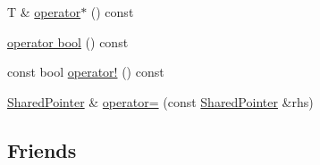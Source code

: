 \begin{DoxyCompactItemize}
\item 
T \& \hyperlink{classprism_1_1memory_1_1_shared_pointer_adf943a2f6f6a11cc995297a10214c6c1}{operator$\ast$} () const 
\item 
\hyperlink{classprism_1_1memory_1_1_shared_pointer_a212f5f8d8a4580e2f8c2491e976f76df}{operator bool} () const 
\item 
const bool \hyperlink{classprism_1_1memory_1_1_shared_pointer_a8d90b48e776bacc5b6bc0a55f9a1d0bc}{operator!} () const 
\item 
\hyperlink{classprism_1_1memory_1_1_shared_pointer}{Shared\+Pointer} \& \hyperlink{classprism_1_1memory_1_1_shared_pointer_a79d197f806002c7d11da1009f47df7ca}{operator=} (const \hyperlink{classprism_1_1memory_1_1_shared_pointer}{Shared\+Pointer} \&rhs)
\end{DoxyCompactItemize}
\subsection*{Friends}
